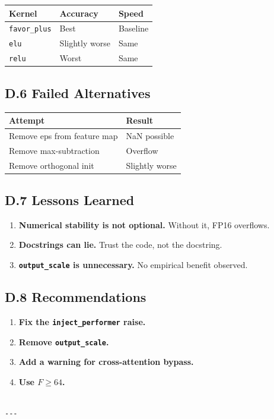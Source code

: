 \begin{table}[H]
\centering
\small
\begin{tabular}{lll}
\toprule
\textbf{Kernel} & \textbf{Accuracy} & \textbf{Speed} \\
\midrule
\texttt{favor\_plus} & Best & Baseline \\
\texttt{elu} & Slightly worse & Same \\
\texttt{relu} & Worst & Same \\
\bottomrule
\end{tabular}
\end{table}

\subsection{D.6 Failed Alternatives}

\begin{table}[H]
\centering
\small
\begin{tabular}{ll}
\toprule
\textbf{Attempt} & \textbf{Result} \\
\midrule
Remove eps from feature map & NaN possible \\
Remove max-subtraction & Overflow \\
Remove orthogonal init & Slightly worse \\
\bottomrule
\end{tabular}
\end{table}

\subsection{D.7 Lessons Learned}

\begin{enumerate}
\item \textbf{Numerical stability is not optional.} Without it, FP16 overflows.
\item \textbf{Docstrings can lie.} Trust the code, not the docstring.
\item \textbf{\texttt{output\_scale} is unnecessary.} No empirical benefit observed.

\end{enumerate}
\subsection{D.8 Recommendations}

\begin{enumerate}
\item \textbf{Fix the \texttt{inject\_performer} raise.}
\item \textbf{Remove \texttt{output\_scale}.}
\item \textbf{Add a warning for cross-attention bypass.}
\item \textbf{Use $F \geq 64$.}
\end{enumerate}
\begin{lstlisting}

---
\end{lstlisting}